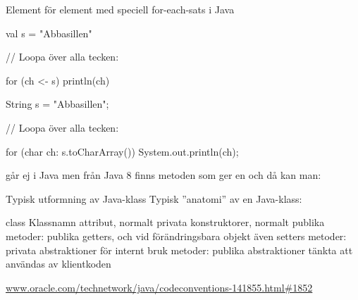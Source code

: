 \begin{Slide}{Element för element med speciell for-each-sats i Java}
\begin{multicols}{2}
\noindent{}
\begin{CodeSmall}[basicstyle=\ttfamily\SlideFontSize{6}{8},backgroundcolor=\color{white},
  frame=none]
val s = "Abbasillen"

// Loopa över alla tecken:

for (ch <- s) {
  println(ch)
}
\end{CodeSmall}

\columnbreak

\noindent{}
\begin{CodeSmall}[language=Java,basicstyle=\ttfamily\SlideFontSize{6}{8},backgroundcolor=\color{white},
  frame=none]
String s = "Abbasillen";

// Loopa över alla tecken:

for (char ch: s.toCharArray()) {
  System.out.println(ch);
}
\end{CodeSmall}
\end{multicols}

\pause
{\noindent\SlideFontSmall
{} går ej i Java men
från Java 8 finns metoden  som ger en  och då kan man: \\
 }
\end{Slide}






\begin{Slide}{Typisk utformning av Java-klass}
Typisk ''anatomi'' av en Java-klass:
\begin{Code}[language=Java]
class Klassnamn {
    attribut, normalt privata
    konstruktorer, normalt publika
    metoder: publika getters, och vid förändringsbara objekt även setters
    metoder: privata abstraktioner för internt bruk
    metoder: publika abstraktioner tänkta att användas av klientkoden
}
\end{Code}
\href{http://www.oracle.com/technetwork/java/codeconventions-141855.html#1852}{www.oracle.com/technetwork/java/codeconventions-141855.html\#1852}
\end{Slide}


